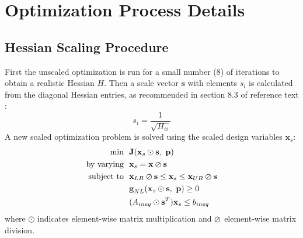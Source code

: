\clearpage
\section{Optimization Process Details}

\subsection{Hessian Scaling Procedure}\label{sec:appendix-scaling}
First the unscaled optimization is run for a small number (8) of iterations to obtain a realistic Hessian $H$.
Then a scale vector $\textbf{s}$ with elements $s_i$ is calculated from the diagonal Hessian entries, as recommended in section 8.3 of reference text \cite{papalambros_principles_2017}:
\begin{equation}
    s_i = \frac{1}{\sqrt{H_{ii}}}
\end{equation}
A new scaled optimization problem is solved using the scaled design variables $\textbf{x}_s$:
\begin{equation}
\begin{aligned}
    \text{min}~~& \textbf{J}(\textbf{x}_s \odot \textbf{s},~\textbf{p}) \\
    \text{by varying}~~&\textbf{x}_s= \textbf{x} \varoslash \textbf{s}\\
    \text{subject to}~~ &\textbf{x}_{LB}\varoslash \textbf{s} \leq \textbf{x}_s \leq \textbf{x}_{UB} \varoslash \textbf{s}\\
    &\textbf{g}_{NL}(\textbf{x}_s\odot\textbf{s},~\textbf{p}) \geq 0\\
    & (A_{ineq} \odot \textbf{s}^T)\textbf{x}_s \leq b_{ineq}
\label{standard}
\end{aligned}
\end{equation}
where $\odot$ indicates element-wise matrix multiplication and $\varoslash$ element-wise matrix division.

